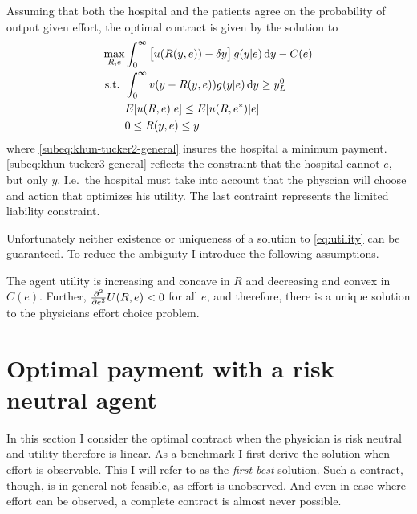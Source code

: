 Assuming that both the hospital and the patients agree on the probability of output given effort, the optimal contract is given by the solution to
\begin{subequations}
\label{eq:khun-tucker-general}
\begin{align}
    \max_{R,e} & \int_0^{\infty}\left[u(R(y,e))-\delta y\right]g(y|e)\dif y-C(e)\label{subeq:khun-tucker1-general} \\
    \text{s.t. }    & \int_{0}^{\infty} v(y-R(y,e))g(y|e)\dif y\geq y_L^0 \label{subeq:khun-tucker2-general} \\
                    & E[u(R,e)|e]\leq E[u(R,e^*)|e] \label{subeq:khun-tucker3-general}\\
                    & 0\leq R(y,e)\leq y \label{subeq:khun-tucker4-general}
\end{align}
\end{subequations}
where \cref{subeq:khun-tucker2-general} insures the hospital a minimum payment. \cref{subeq:khun-tucker3-general} reflects the constraint that the hospital cannot $e$, but only $y$. I.e.\ the hospital must take into account that the physcian will choose and action that optimizes his utility. The last contraint represents the limited liability constraint. 

Unfortunately neither existence or uniqueness of a solution to \cref{eq:utility} can be guaranteed. To reduce the ambiguity I introduce the following assumptions. 

\begin{assumption}
\label{asump:unique-solution}
The agent utility is increasing and concave in $R$ and decreasing and convex in $C(e)$. Further, $\pder[][2]{e}U(R,e)<0$ for all $e$, and therefore, there is a unique solution to the physicians effort choice problem.
\end{assumption}



\section{Optimal payment with a risk neutral agent} %
\label{sec:optimal_payment_with_a_risk_neutral_agent}
In this section I consider the optimal contract when the physician is risk neutral and utility therefore is linear. As a benchmark I first derive the solution when effort is observable. This I will refer to as the \emph{first-best} solution. Such a contract, though, is in general not feasible, as effort is unobserved. And even in case where effort can be observed, a complete contract is almost never possible. 

